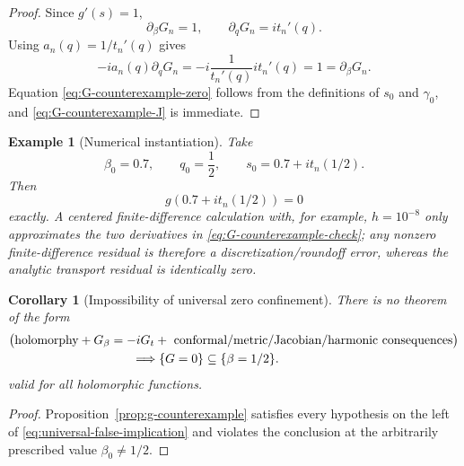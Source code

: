 \documentclass[11pt]{amsart}
\numberwithin{equation}{section}
\newtheorem{corollary}[theorem]{Corollary}
\newtheorem{example}[theorem]{Example}
\begin{document}
\begin{proof}
Since $g'(s)=1$,
\begin{equation}
 \partial_\beta G_n=1,
 \qquad
 \partial_qG_n=i t_n'(q).
 \label{eq:G-counterexample-derivatives}
\end{equation}
Using $a_n(q)=1/t_n'(q)$ gives
\begin{equation}
 -i a_n(q)\partial_qG_n
 =-i\frac1{t_n'(q)}i t_n'(q)=1
 =\partial_\beta G_n.
 \label{eq:G-counterexample-check}
\end{equation}
Equation \eqref{eq:G-counterexample-zero} follows from the definitions of
$s_0$ and $\gamma_0$, and \eqref{eq:G-counterexample-J} is immediate.
\end{proof}

\begin{example}[Numerical instantiation]
\label{ex:g-numerical}
Take
\begin{equation}
 \beta_0=0.7,
 \qquad
 q_0=\frac12,
 \qquad
 s_0=0.7+i t_n(1/2).
 \label{eq:g-numerical-parameters}
\end{equation}
Then
\begin{equation}
 g(0.7+i t_n(1/2))=0
 \label{eq:g-numerical-zero}
\end{equation}
exactly.  A centered finite-difference calculation with, for example,
$h=10^{-8}$ only approximates the two derivatives in
\eqref{eq:G-counterexample-check}; any nonzero finite-difference residual is
therefore a discretization/roundoff error, whereas the analytic transport
residual is identically zero.
\end{example}

\begin{corollary}[Impossibility of universal zero confinement]
\label{cor:universal-no-confinement}
There is no theorem of the form
\begin{equation}
 \begin{aligned}
 &\bigl(\text{holomorphy}+G_\beta=-iG_t
 +\text{ conformal/metric/Jacobian/harmonic consequences}\bigr)\\
 &\hspace{35mm}\Longrightarrow
 \{G=0\}\subseteq\{\beta=1/2\}.
 \end{aligned}
 \label{eq:universal-false-implication}
\end{equation}
valid for all holomorphic functions.
\end{corollary}

\begin{proof}
Proposition~\ref{prop:g-counterexample} satisfies every hypothesis on the left
of \eqref{eq:universal-false-implication} and violates the conclusion at the
arbitrarily prescribed value $\beta_0\neq1/2$.
\end{proof}
\end{document}

